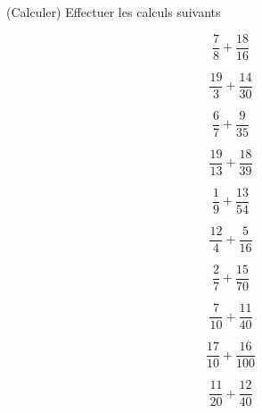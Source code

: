  (Calculer) Effectuer les calculs suivants

\begin{multicols}{5}
$$\dfrac{7}{8}+\dfrac{18}{16}$$

$$\dfrac{19}{3}+\dfrac{14}{30}$$

$$\dfrac{6}{7}+\dfrac{9}{35}$$

$$\dfrac{19}{13}+\dfrac{18}{39}$$

$$\dfrac{1}{9}+\dfrac{13}{54}$$

$$\dfrac{12}{4}+\dfrac{5}{16}$$

$$\dfrac{2}{7}+\dfrac{15}{70}$$

$$\dfrac{7}{10}+\dfrac{11}{40}$$

$$\dfrac{17}{10}+\dfrac{16}{100}$$

$$\dfrac{11}{20}+\dfrac{12}{40}$$

\end{multicols}